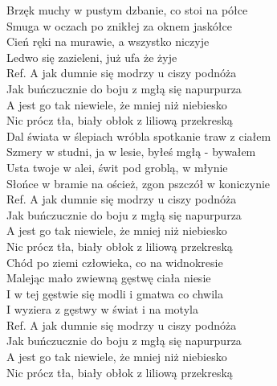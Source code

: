 
\begin{flushleft}
Brzęk muchy w pustym dzbanie, co stoi na półce  \\
Smuga w oczach po znikłej za oknem jaskółce \tab{} \\
Cień ręki na murawie, a wszystko niczyje \tab{} \\
Ledwo się zazieleni, już ufa że żyje \tab{}  \\
\vskip 3mm
Ref. A jak dumnie się modrzy u ciszy podnóża\\
\hspace{0.9cm}Jak buńczucznie do boju z mgłą się napurpurza \\
\hspace{0.9cm}A jest go tak niewiele, że mniej niż niebiesko \\
\hspace{0.9cm}Nic prócz tła, biały obłok z liliową przekreską \\
\vskip 3mm
Dal świata w ślepiach wróbla spotkanie traw z ciałem \\
Szmery w studni, ja w lesie, byłeś mgłą - bywałem \\
Usta twoje w alei, świt pod groblą, w młynie \\
Słońce w bramie na oścież, zgon pszczół w koniczynie \\
\vskip 3mm
Ref. A jak dumnie się modrzy u ciszy podnóża\\
\hspace{0.9cm}Jak buńczucznie do boju z mgłą się napurpurza \\
\hspace{0.9cm}A jest go tak niewiele, że mniej niż niebiesko \\
\hspace{0.9cm}Nic prócz tła, biały obłok z liliową przekreską \\
\vskip 3mm
Chód po ziemi człowieka, co na widnokresie \\
Malejąc mało zwiewną gęstwę ciała niesie \\
I w tej gęstwie się modli i gmatwa co chwila \\
I wyziera z gęstwy w świat i na motyla \\
\vskip 3mm
Ref. A jak dumnie się modrzy u ciszy podnóża\\
\hspace{0.9cm}Jak buńczucznie do boju z mgłą się napurpurza \\
\hspace{0.9cm}A jest go tak niewiele, że mniej niż niebiesko \\
\hspace{0.9cm}Nic prócz tła, biały obłok z liliową przekreską \\
\end{flushleft}
\clearpage
